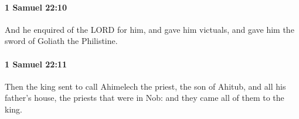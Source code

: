 		\paragraph{1 Samuel 22:10} %
			\label{1SAMUEL-22-10}

			And he enquired of the LORD for him, and gave him victuals, and gave him the sword of Goliath the Philistine.


		\paragraph{1 Samuel 22:11} %
			\label{1SAMUEL-22-11}

			Then the king sent to call Ahimelech the priest, the son of Ahitub, and all his father’s house, the priests that were in Nob: and they came all of them to the king.


